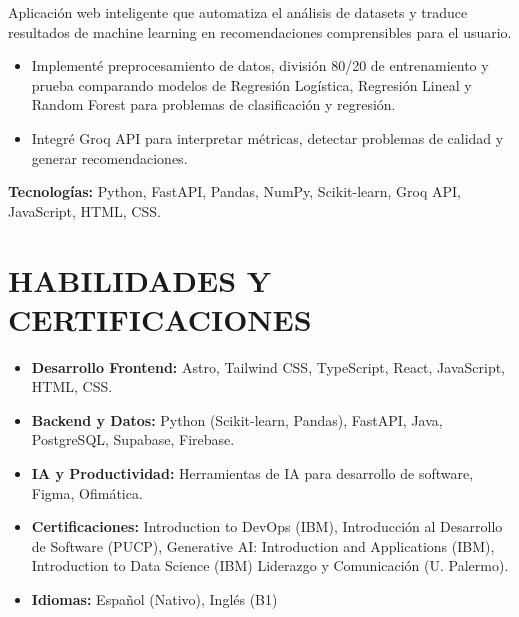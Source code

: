 \documentclass[a4paper,11pt]{article}
\begin{document}
\small
Aplicación web inteligente que automatiza el análisis de datasets y traduce resultados de machine learning en recomendaciones comprensibles para el usuario.
\begin{itemize}[leftmargin=1.5em, nosep]
    \item Implementé preprocesamiento de datos, división 80/20 de entrenamiento y prueba comparando modelos de Regresión Logística, Regresión Lineal y Random Forest para problemas de clasificación y regresión.
    \item Integré Groq API para interpretar métricas, detectar problemas de calidad y generar recomendaciones.
\end{itemize}

\textbf{Tecnologías:} Python, FastAPI, Pandas, NumPy, Scikit-learn, Groq API, JavaScript, HTML, CSS.

\vspace{5mm}

\section{\textbf{HABILIDADES Y CERTIFICACIONES}}

\begin{itemize}[leftmargin=1.5em, nosep]
\item \textbf{Desarrollo Frontend:} Astro, Tailwind CSS, TypeScript, React, JavaScript, HTML, CSS.
    \item \textbf{Backend y Datos:} Python (Scikit-learn, Pandas), FastAPI, Java, PostgreSQL, Supabase, Firebase.
    \item \textbf{IA y Productividad:} Herramientas de IA para desarrollo de software, Figma, Ofimática.
    \item \textbf{Certificaciones:} Introduction to DevOps (IBM), Introducción al Desarrollo de Software (PUCP), Generative AI: Introduction and Applications (IBM), Introduction to Data Science (IBM) Liderazgo y Comunicación (U. Palermo).
    \item \textbf{Idiomas:} Español (Nativo), Inglés (B1)
\end{itemize}
\end{document}
